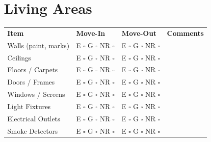 
\section*{Living Areas}
\label{sec:living}

\begin{longtable}{p{6cm} p{3cm} p{3cm} p{4cm}}
\textbf{Item} & \textbf{Move-In} & \textbf{Move-Out} & \textbf{Comments} \\
Walls (paint, marks) & E $\square$ G $\square$ NR $\square$ & E $\square$ G $\square$ NR $\square$ & \\
Ceilings & E $\square$ G $\square$ NR $\square$ & E $\square$ G $\square$ NR $\square$ & \\
Floors / Carpets & E $\square$ G $\square$ NR $\square$ & E $\square$ G $\square$ NR $\square$ & \\
Doors / Frames & E $\square$ G $\square$ NR $\square$ & E $\square$ G $\square$ NR $\square$ & \\
Windows / Screens & E $\square$ G $\square$ NR $\square$ & E $\square$ G $\square$ NR $\square$ & \\
Light Fixtures & E $\square$ G $\square$ NR $\square$ & E $\square$ G $\square$ NR $\square$ & \\
Electrical Outlets & E $\square$ G $\square$ NR $\square$ & E $\square$ G $\square$ NR $\square$ & \\
Smoke Detectors & E $\square$ G $\square$ NR $\square$ & E $\square$ G $\square$ NR $\square$ & \\
\end{longtable}

